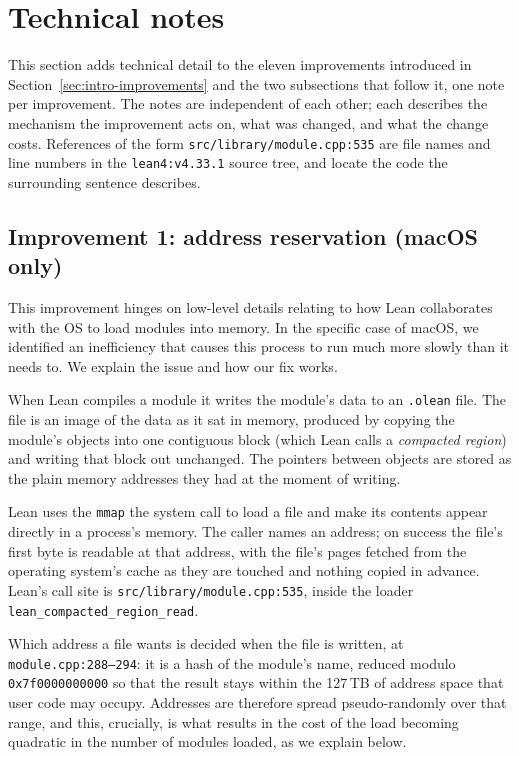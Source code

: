 \documentclass{article}
\newcommand{\Lean}{Lean\xspace}      %
\newcommand{\currentlean}{\texttt{lean4:v4.33.1}\xspace}
\begin{document}
\section{Technical notes}
\label{sec:technotes}

This section adds technical detail to the eleven improvements introduced in Section~\ref{sec:intro-improvements} and the two subsections that follow it, one note per improvement. The notes are independent of each other; each describes the mechanism the improvement acts on, what was changed, and what the change costs. References of the form \texttt{src/library/module.cpp:535} are file names and line numbers in the \currentlean source tree, and locate the code the surrounding sentence describes.

\subsection{Improvement 1: address reservation (macOS only)}
\label{sec:tn-1}

This improvement hinges on low-level details relating to how \Lean collaborates with the OS to load modules into memory. In the specific case of macOS, we identified an inefficiency that causes this process to run much more slowly than it needs to. We explain the issue and how our fix works.

When \Lean compiles a module it writes the module's data to an \texttt{.olean} file. The file 
is an image of the data as it sat in memory, produced by copying the module's objects into one contiguous block (which \Lean calls a \emph{compacted region}) and writing that block out unchanged. The pointers between objects are stored as the plain memory addresses they had at the moment of writing.

\Lean uses the \texttt{mmap} the system call to load a file and make its contents appear directly in a process's memory. The caller names an address; on success the file's first byte is readable at that address, with the file's pages fetched from the operating system's cache as they are touched and nothing copied in advance. \Lean's call site is \texttt{src/library/module.cpp:535}, inside the loader \texttt{lean\_compacted\_region\_read}.

Which address a file wants is decided when the file is written, at \texttt{module.cpp:288--294}: it is a hash of the module's name, reduced modulo \texttt{0x7f0000000000} so that the result stays within the 127\,TB of address space that user code may occupy. Addresses are therefore spread pseudo-randomly over that range, and this, crucially, is what results in the cost of the load becoming quadratic in the number of modules loaded, as we explain below.
\end{document}
